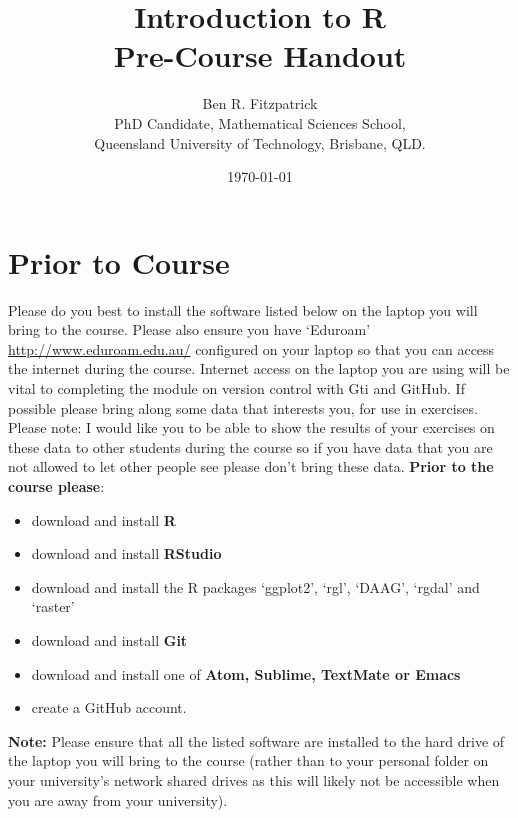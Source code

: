 \documentclass{article}[12pt]
\begin{document}
\title{\huge Introduction to R \\
 \large Pre-Course Handout}


\author{Ben R. Fitzpatrick\\ 
\small PhD Candidate, Mathematical Sciences School,\\
\small Queensland University of Technology, Brisbane, QLD.}
\date{\today}
\maketitle

\section*{Prior to Course}
Please do you best to install the software listed below on the laptop you will bring to the course.
Please also ensure you have `Eduroam' \url{http://www.eduroam.edu.au/} configured on your laptop so that you can access the internet during the course.  
Internet access on the laptop you are using will be vital to completing the module on version control with Gti and GitHub.
If possible please bring along some data that interests you, for use in exercises.
Please note: I would like you to be able to show the results of your exercises on these data to other students during the course so if you have data that you are not allowed to let other people see please don't bring these data.
\newline
\newline
\textbf{Prior to the course please}: \begin{itemize}
\item download and install \textbf{R}
\item download and install \textbf{RStudio}
\item download and install the R packages `ggplot2', `rgl', `DAAG', `rgdal' and `raster'
\item download and install \textbf{Git}
\item download and install one of \textbf{Atom, Sublime, TextMate or Emacs}
\item create a GitHub account. \end{itemize}

\textbf{Note:} Please ensure that all the listed software are installed to the hard drive of the laptop you will bring to the course (rather than to your personal folder on your university's network shared drives as this will likely not be accessible when you are away from your university).
\end{document}
